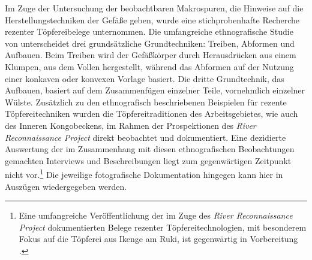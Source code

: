 Im Zuge der Untersuchung der beobachtbaren Makrospuren, die Hinweise auf die Herstellungstechniken der Gefäße geben, wurde eine stichprobenhafte Recherche rezenter Töpfereibelege unternommen. Die umfangreiche ethnografische Studie von \textcite[44]{Drost.1967} unterscheidet drei grundsätzliche Grundtechniken: Treiben, Abformen und Aufbauen. Beim Treiben wird der Gefäßkörper durch Herausdrücken aus einem Klumpen, aus dem Vollen hergestellt, während das Abformen auf der Nutzung einer konkaven oder konvexen Vorlage basiert. Die dritte Grundtechnik, das Aufbauen, basiert auf dem Zusammenfügen einzelner Teile, vornehmlich einzelner Wülste. Zusätzlich zu den ethnografisch beschriebenen Beispielen für rezente Töpfereitechniken wurden die Töpfereitraditionen des Arbeitsgebietes, wie auch des Inneren Kongobeckens, im Rahmen der Prospektionen des \textit{River Reconnaissance Project} direkt beobachtet und dokumentiert. Eine dezidierte Auswertung der im Zusammenhang mit diesen ethnografischen Beobachtungen gemachten Interviews und Beschreibungen liegt zum gegenwärtigen Zeitpunkt nicht vor.\footnote{Eine umfangreiche Veröffentlichung der im Zuge des \textit{River Reconnaissance Project} dokumentierten Belege rezenter Töpfereitechnologien, mit besonderem Fokus auf die Töpferei aus Ikenge am Ruki, ist gegenwärtig in Vorbereitung \parencite{Eggert.inVorb.}.} Die jeweilige fotografische Dokumentation hingegen kann hier in Auszügen wiedergegeben werden. 


